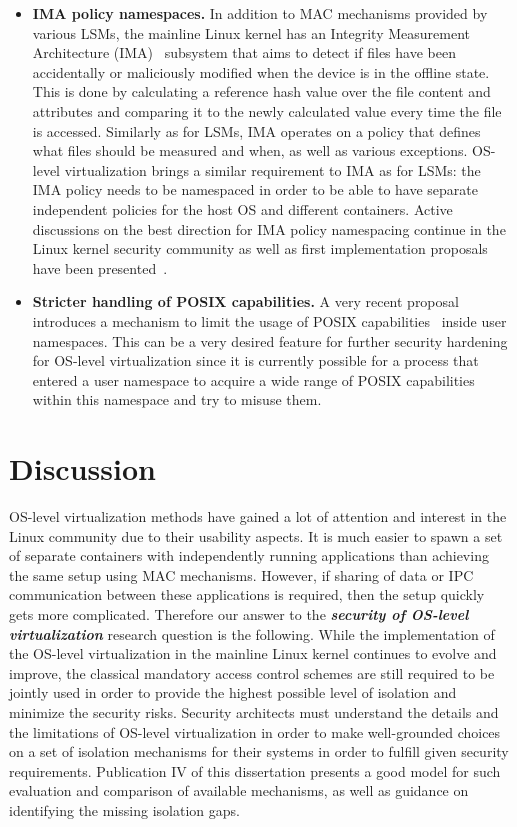\begin{itemize}
	\item \textbf{IMA policy namespaces.} In addition to MAC mechanisms provided by various LSMs, the mainline Linux kernel has an Integrity Measurement Architecture (IMA)~\cite{ima} subsystem that aims to detect if files have been accidentally or maliciously modified when the device is in the offline state. This is done by calculating a reference hash value over the file content and attributes and comparing it to the newly calculated value every time the file is accessed. Similarly as for LSMs, IMA operates on a policy that defines what files should be measured and when, as well as various exceptions. OS-level virtualization brings a similar requirement to IMA as for LSMs: the IMA policy needs to be namespaced in order to be able to have separate independent policies for the host OS and different containers. Active discussions on the best direction for IMA policy namespacing continue in the Linux kernel security community as well as first implementation proposals have been presented~\cite{magalhaes2017}. 
	\item \textbf{Stricter handling of POSIX capabilities.} A very recent proposal~\cite{Bandewar2017} introduces a mechanism to limit the usage of POSIX capabilities~\cite{caps} inside user namespaces. This can be a very desired feature for further security hardening for OS-level virtualization since it is currently possible for a process that entered a user namespace to acquire a wide range of POSIX capabilities within this namespace and try to misuse them. 
\end{itemize}


\section{Discussion}

OS-level virtualization methods have gained a lot of attention and interest in the Linux community due to their usability aspects. It is much easier to spawn a set of separate containers with independently running applications than achieving the same setup using MAC mechanisms. However, if sharing of data or IPC communication between these applications is required, then the setup quickly gets more complicated. Therefore our answer to the \textbf{\textit{security of OS-level virtualization}} research question is the following. While the implementation of the OS-level virtualization in the mainline Linux kernel continues to evolve and improve, the classical mandatory access control schemes are still required to be jointly used in order to provide the highest possible level of isolation and minimize the security risks. Security architects must understand the details and the limitations of OS-level virtualization in order to make well-grounded choices on a set of isolation mechanisms for their systems in order to fulfill given security requirements. Publication IV of this dissertation presents a good model for such evaluation and comparison of available mechanisms, as well as guidance on identifying the missing isolation gaps. 


